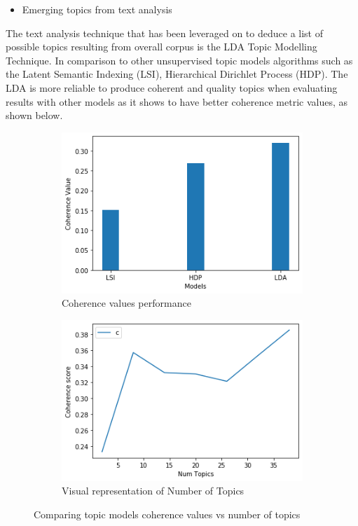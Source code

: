 \begin{itemize}
    \item Emerging topics from text analysis
\end{itemize}

The text analysis technique that has been leveraged on to deduce a list of possible topics resulting from overall corpus is the LDA Topic Modelling Technique.  In comparison to other unsupervised topic models algorithms such as the Latent Semantic Indexing (LSI), Hierarchical Dirichlet Process (HDP).  The LDA is more reliable to produce coherent and quality topics when evaluating results with other models as it shows to have better coherence metric values, as shown below.\\

\begin{figure}
      \centering
	    \begin{subfigure}{0.1\linewidth}
		\includegraphics[width=\linewidth]{Evaluate coherence values.png}
		\caption{Coherence values performance }
		\label{fig: Coherence Values}
	   \end{subfigure}
	   \begin{subfigure}{0.1\linewidth}
		\includegraphics[width=\linewidth]{Number of Topics for the overall data.png}
		\caption{Visual representation of Number of Topics}
		\label{fig:Number of Topics selection}
	    \end{subfigure}
	   \vfill
	 \caption{Comparing topic models coherence values vs  number of topics}
\end{figure}

